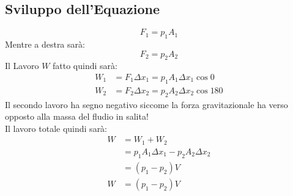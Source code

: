         \subsection{Sviluppo dell'Equazione}
            \begin{equation*}
                F_1 = p_1 A_1
            \end{equation*}
        Mentre a destra sarà:
            \begin{equation*}
                F_2 = p_2 A_2
            \end{equation*}
        Il Lavoro $W$ fatto quindi sarà:
            \begin{align*}
                W_1 &= F_1 \Delta x_1 = p_1 A_1 \Delta x_1 \cos 0\\
                W_2 &= F_2 \Delta x_2 = p_2 A_2 \Delta x_2 \cos 180
            \end{align*}
        Il secondo lavoro ha segno negativo siccome la forza gravitazionale ha 
        verso opposto alla massa del fludio in salita! \\
        Il lavoro totale quindi sarà:
            \begin{align*}
                W &= W_1 + W_2 \\
                &= p_1 A_1 \Delta x_1 - p_2 A_2 \Delta x_2 \\
                &= (p_1 - p_2) V \\
                W &= (p_1 - p_2)V 
            \end{align*}

